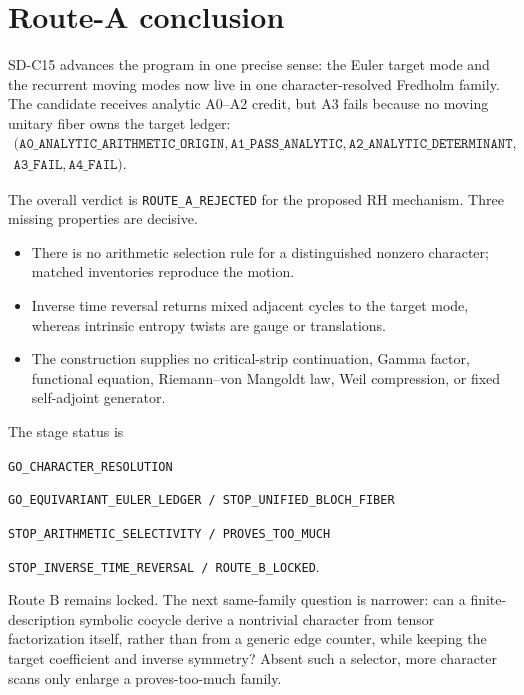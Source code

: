 \section{Route-A conclusion}

SD-C15 advances the program in one precise sense: the Euler target mode and
the recurrent moving modes now live in one character-resolved Fredholm
family.  The candidate receives analytic A0--A2 credit, but A3 fails because
no moving unitary fiber owns the target ledger:
\[
\begin{gathered}
 (\texttt{A0\_ANALYTIC\_ARITHMETIC\_ORIGIN},
  \texttt{A1\_PASS\_ANALYTIC},
  \texttt{A2\_ANALYTIC\_DETERMINANT},\\
  \texttt{A3\_FAIL},
  \texttt{A4\_FAIL}).
\end{gathered}                                           \tag{7.1}
\]

The overall verdict is \texttt{ROUTE\_A\_REJECTED} for the proposed RH
mechanism.  Three missing properties are decisive.
\begin{itemize}
 \item There is no arithmetic selection rule for a distinguished nonzero
       character; matched inventories reproduce the motion.
 \item Inverse time reversal returns mixed adjacent cycles to the target
       mode, whereas intrinsic entropy twists are gauge or translations.
 \item The construction supplies no critical-strip continuation, Gamma
       factor, functional equation, Riemann--von Mangoldt law, Weil
       compression, or fixed self-adjoint generator.
\end{itemize}

The stage status is
\begin{center}
\texttt{GO\_CHARACTER\_RESOLUTION}\par
\texttt{GO\_EQUIVARIANT\_EULER\_LEDGER / STOP\_UNIFIED\_BLOCH\_FIBER}\par
\texttt{STOP\_ARITHMETIC\_SELECTIVITY / PROVES\_TOO\_MUCH}\par
\texttt{STOP\_INVERSE\_TIME\_REVERSAL / ROUTE\_B\_LOCKED}.
\end{center}
Route B remains locked.  The next same-family question is narrower: can a
finite-description symbolic cocycle derive a nontrivial character from
tensor factorization itself, rather than from a generic edge counter, while
keeping the target coefficient and inverse symmetry?  Absent such a selector,
more character scans only enlarge a proves-too-much family.

